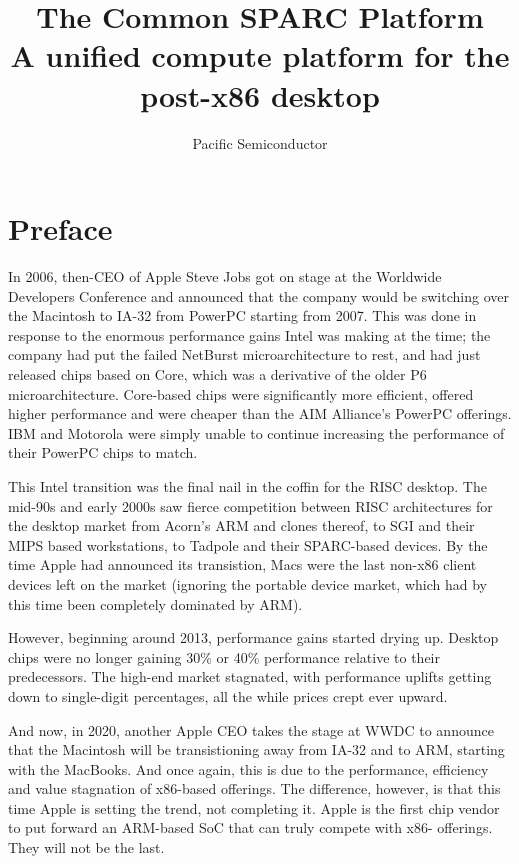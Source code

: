 \documentclass[12pt]{report}
\title{The Common SPARC Platform\\\large{A unified compute platform for the post-x86 desktop}}
\author{Pacific Semiconductor}
\begin{document}
\maketitle

\newpage

\section{Preface}
In 2006, then-CEO of Apple Steve Jobs got on stage at the Worldwide Developers Conference and announced that the company
would be switching over the Macintosh to IA-32 from PowerPC starting from 2007. This was done in response to the enormous
performance gains Intel was making at the time; the company had put the failed NetBurst microarchitecture to rest, and
had just released chips based on Core, which was a derivative of the older P6 microarchitecture. Core-based chips were
significantly more efficient, offered higher performance and were cheaper than the AIM Alliance's PowerPC offerings. IBM
and Motorola were simply unable to continue increasing the performance of their PowerPC chips to match.

This Intel transition was the final nail in the coffin for the RISC desktop. The mid-90s and early 2000s saw fierce
competition between RISC architectures for the desktop market from Acorn's ARM and clones thereof, to SGI and their MIPS
based workstations, to Tadpole and their SPARC-based devices. By the time Apple had announced its transistion, Macs were
the last non-x86 client devices left on the market (ignoring the portable device market, which had by this time been
completely dominated by ARM).

However, beginning around 2013, performance gains started drying up. Desktop chips were no longer gaining 30\% or 40\%
performance relative to their predecessors. The high-end market stagnated, with performance uplifts getting down to single-digit
percentages, all the while prices crept ever upward.

And now, in 2020, another Apple CEO takes the stage at WWDC to announce that the Macintosh will be transistioning away
from IA-32 and to ARM, starting with the MacBooks. And once again, this is due to the performance, efficiency and value
stagnation of x86-based offerings. The difference, however, is that this time Apple is setting the trend, not completing
it. Apple is the first chip vendor to put forward an ARM-based SoC that can truly compete with x86- offerings. They will
not be the last.
\end{document}
